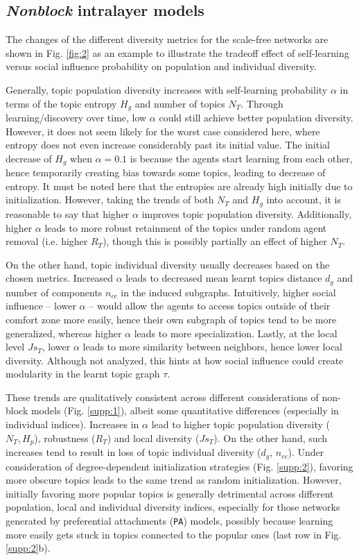 \documentclass{svproc}
\begin{document}
\subsection{\textit{Nonblock} intralayer models} \label{results:nonblock}

The changes of the different diversity metrics for the scale-free networks are shown in Fig. \ref{fig:2} as an example to illustrate the tradeoff effect of self-learning versus social influence probability on population and individual diversity.

Generally, topic population diversity increases with self-learning probability $\alpha$ in terms of the topic entropy $H_g$ and number of topics $N_T$.
Through learning/discovery over time, low $\alpha$ could still achieve better population diversity.
However, it does not seem likely for the worst case considered here, where entropy does not even increase considerably past its initial value.
The initial decrease of $H_g$ when $\alpha = 0.1$ is because the agents start learning from each other, hence temporarily creating bias towards some topics, leading to decrease of entropy.
It must be noted here that the entropies are already high initially due to initialization.
However, taking the trends of both $N_T$ and $H_g$ into account, it is reasonable to say that higher $\alpha$ improves topic population diversity.
Additionally, higher $\alpha$ leads to more robust retainment of the topics under random agent removal (i.e. higher $R_T$), though this is possibly partially an effect of higher $N_T$.

On the other hand, topic individual diversity usually decreases based on the chosen metrics.
Increased $\alpha$ leads to decreased mean learnt topics distance $d_g$ and number of components $n_{cc}$ in the induced subgraphs.
Intuitively, higher social influence  -- lower $\alpha$ -- would allow the agents to access topics outside of their comfort zone more easily,
    hence their own subgraph of topics tend to be more generalized,
    whereas higher $\alpha$ leads to more specialization.
Lastly, at the local level $Js_T$, lower $\alpha$ leads to more similarity between neighbors, hence lower local diversity.
Although not analyzed, this hints at how social influence could create modularity in the learnt topic graph $\tau$.

These trends are qualitatively consistent across different considerations of non-block models (Fig. \ref{supp:1}), albeit some quantitative differences (especially in individual indices).
Increases in $\alpha$ lead to higher topic population diversity ($N_T, H_p$), robustness ($R_T$) and local diversity ($Js_T$).
On the other hand, such increases tend to result in loss of topic individual diversity ($d_g$, $n_{cc}$).
Under consideration of degree-dependent initialization strategies (Fig. \ref{supp:2}), favoring more obscure topics leads to the same trend as random initialization.
However, initially favoring more popular topics
    is generally detrimental across different population, local and individual diversity indices,
    especially for those networks generated by preferential attachments (\texttt{PA}) models,
        possibly because learning more easily gets stuck in topics connected to the popular ones (last row in Fig. \ref{supp:2}b).
\end{document}
